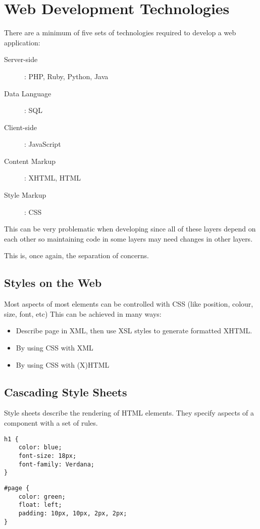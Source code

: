 \section{Web Development Technologies}\label{sec:web_development_technologies}

There are a minimum of five sets of technologies required to develop a web application:

\begin{description}
	\item[Server-side]: PHP, Ruby, Python, Java
	\item[Data Language]: SQL
	\item[Client-side]: JavaScript
	\item[Content Markup]: XHTML, HTML
	\item[Style Markup]: CSS
\end{description}
This can be very problematic when developing since all of these layers depend on each other so maintaining code in some layers may need changes in other layers.

This is, once again, the separation of concerns.

\subsection{Styles on the Web}\label{sub:styles_on_the_web}

Most aspects of most elements can be controlled with CSS (like position, colour, size, font, etc)
This can be achieved in many ways:
\begin{itemize}
	\item Describe page in XML, then use XSL styles to generate formatted XHTML.
	\item By using CSS with XML
	\item By using CSS with (X)HTML
\end{itemize}

\subsection{Cascading Style Sheets}\label{sub:cascading_style_sheets}

Style sheets describe the rendering of HTML elements.
They specify aspects of a component with a set of rules.

\medskip
\begin{minipage}{0.45\linewidth}
	\begin{verbatim}
h1 {
    color: blue;
    font-size: 18px;
    font-family: Verdana;
}
\end{verbatim}
\end{minipage}
\hfill
\begin{minipage}{0.45\linewidth}
	\begin{verbatim}
#page {
    color: green;
    float: left;
    padding: 10px, 10px, 2px, 2px;
}
\end{verbatim}
\end{minipage}

